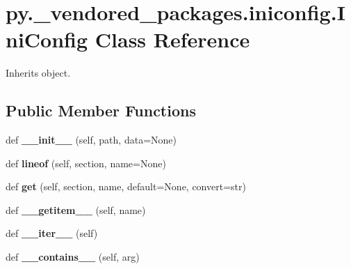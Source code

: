 \hypertarget{classpy_1_1__vendored__packages_1_1iniconfig_1_1_ini_config}{}\section{py.\+\_\+vendored\+\_\+packages.\+iniconfig.\+Ini\+Config Class Reference}
\label{classpy_1_1__vendored__packages_1_1iniconfig_1_1_ini_config}


Inherits object.

\subsection*{Public Member Functions}
\begin{DoxyCompactItemize}
\item 
\mbox{\label{classpy_1_1__vendored__packages_1_1iniconfig_1_1_ini_config_aad52972e68004b1c8ff2f88beadde8a8}} 
def {\bfseries \+\_\+\+\_\+init\+\_\+\+\_\+} (self, path, data=None)
\item 
\mbox{\label{classpy_1_1__vendored__packages_1_1iniconfig_1_1_ini_config_ac998c44006edeac73efdbac8739b9552}} 
def {\bfseries lineof} (self, section, name=None)
\item 
\mbox{\label{classpy_1_1__vendored__packages_1_1iniconfig_1_1_ini_config_a5978cbb44fa5deb6685505b76630c83f}} 
def {\bfseries get} (self, section, name, default=None, convert=str)
\item 
\mbox{\label{classpy_1_1__vendored__packages_1_1iniconfig_1_1_ini_config_aad21363d11e6441c91482633410460ac}} 
def {\bfseries \+\_\+\+\_\+getitem\+\_\+\+\_\+} (self, name)
\item 
\mbox{\label{classpy_1_1__vendored__packages_1_1iniconfig_1_1_ini_config_a4a61d60b570008748220ea445ffe24d2}} 
def {\bfseries \+\_\+\+\_\+iter\+\_\+\+\_\+} (self)
\item 
\mbox{\label{classpy_1_1__vendored__packages_1_1iniconfig_1_1_ini_config_a57cac89b791f36c8f561ceb33edd4165}} 
def {\bfseries \+\_\+\+\_\+contains\+\_\+\+\_\+} (self, arg)
\end{DoxyCompactItemize}
